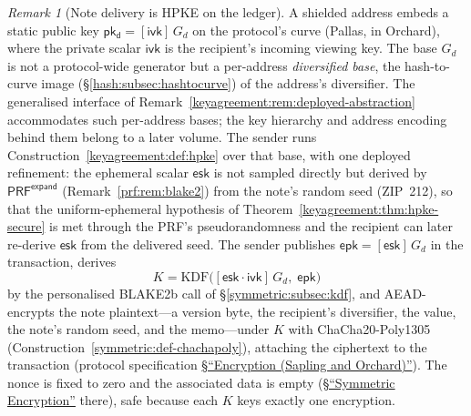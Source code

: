 \documentclass[11pt,a4paper]{article}
\theoremstyle{definition}
\theoremstyle{remark}
\newtheorem{remark}[theorem]{Remark}
\begin{document}
\begin{remark}[Note delivery is HPKE on the ledger]
\label{keyagreement:rem:notes}
A shielded address embeds a static public key
\(\mathsf{pk_d} = [\mathsf{ivk}]\,G_{d}\) on the protocol's curve
(Pallas, in Orchard), where the private scalar \(\mathsf{ivk}\) is
the recipient's incoming viewing key. The base \(G_{d}\) is not a
protocol-wide generator but a per-address \emph{diversified base},
the hash-to-curve image (\S\ref{hash:subsec:hashtocurve}) of the
address's diversifier. The generalised interface of
Remark~\ref{keyagreement:rem:deployed-abstraction} accommodates such
per-address bases; the key hierarchy and address encoding behind them
belong to a later volume.
The sender runs Construction~\ref{keyagreement:def:hpke} over that
base, with one deployed refinement: the ephemeral scalar
\(\mathsf{esk}\) is not sampled directly but derived by
\(\mathsf{PRF}^{\mathsf{expand}}\) (Remark~\ref{prf:rem:blake2})
from the note's random seed (ZIP~212), so that the uniform-ephemeral
hypothesis of Theorem~\ref{keyagreement:thm:hpke-secure} is met
through the PRF's pseudorandomness and the recipient can later
re-derive \(\mathsf{esk}\) from the delivered seed. The sender
publishes \(\mathsf{epk} = [\mathsf{esk}]\,G_{d}\) in the
transaction, derives
\[
K = \mathrm{KDF}\bigl([\mathsf{esk} \cdot \mathsf{ivk}]\,G_{d},\;
\mathsf{epk}\bigr)
\]
by the personalised BLAKE2b call of \S\ref{symmetric:subsec:kdf},
and AEAD-encrypts the note plaintext---a version byte, the
recipient's diversifier, the value, the note's random seed, and the
memo---under \(K\) with \textsf{ChaCha20-Poly1305}
(Construction~\ref{symmetric:def-chachapoly}), attaching the
ciphertext to the transaction (protocol specification
\href{https://zips.z.cash/protocol/protocol.pdf\#saplingandorchardencrypt}{\S``Encryption (Sapling and
Orchard)''}). The nonce is fixed to zero and the associated data is
empty
(\href{https://zips.z.cash/protocol/protocol.pdf\#concretesym}{\S``Symmetric
Encryption''} there), safe because each \(K\) keys exactly one
encryption.


\end{remark}
\end{document}
